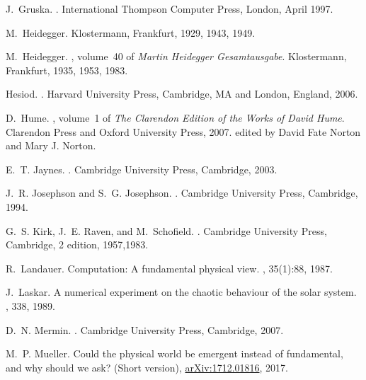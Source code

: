 \documentclass[12pt]{article}
\begin{document}
\begin{thebibliography}{10}
J.~Gruska.
.
\newblock International Thompson Computer Press, London, April 1997.

M.~Heidegger.
\newblock Klostermann, Frankfurt, 1929, 1943, 1949.

M.~Heidegger.
, volume~40 of {\em {M}artin {H}eidegger
  {G}esamtausgabe}.
\newblock Klostermann, Frankfurt, 1935, 1953, 1983.

Hesiod.
.
\newblock Harvard University Press, Cambridge, MA and London, England, 2006.

D.~Hume.
, volume~1 of
  {\em The Clarendon Edition of the Works of David Hume}.
\newblock Clarendon Press and Oxford University Press, 2007.
\newblock edited by David Fate Norton and Mary J. Norton.

E.~T. Jaynes.
.
\newblock Cambridge University Press, Cambridge, 2003.

J.~R. Josephson and S.~G. Josephson.
.
\newblock Cambridge University Press, Cambridge,  1994.

G.~S. Kirk, J.~E. Raven, and M.~Schofield.
.
\newblock Cambridge University Press, Cambridge, 2 edition, 1957,1983.

R.~Landauer.
\newblock Computation: A fundamental physical view.
, 35(1):88, 1987.

J.~Laskar.
\newblock A numerical experiment on the chaotic behaviour of the solar system.
, 338, 1989.

D.~N. Mermin.
.
\newblock Cambridge University Press, Cambridge, 2007.

M.~P. Mueller.
\newblock Could the physical world be emergent instead of fundamental, and why
  should we ask? (Short version), \url{arXiv:1712.01816}, 2017.


\end{thebibliography}
\end{document}
